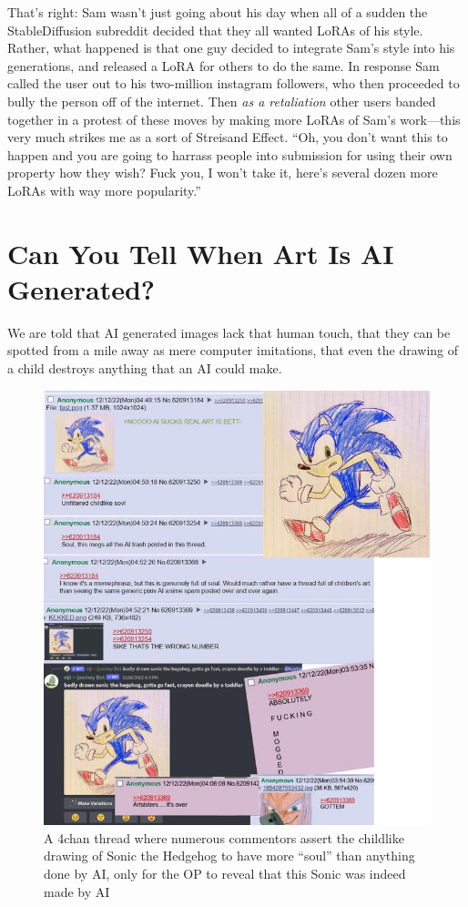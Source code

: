 \documentclass[11pt]{article}
\begin{document}
That's right: Sam wasn't just going about his day when all of a sudden the StableDiffusion subreddit decided that they all wanted LoRAs of his style. Rather, what happened is that one guy decided to integrate Sam's style into his generations, and released a LoRA for others to do the same. In response Sam called the user out to his two-million instagram followers, who then proceeded to bully the person off of the internet. Then \emph{as a retaliation} other users banded together in a protest of these moves by making more LoRAs of Sam's work---this very much strikes me as a sort of Streisand Effect. ``Oh, you don't want this to happen and you are going to harrass people into submission for using their own property how they wish? Fuck you, I won't take it, here's several dozen more LoRAs with way more popularity.''

\section*{Can You Tell When Art Is AI Generated?}
\label{sec:org07198dd}
We are told that AI generated images lack that human touch, that they can be spotted from a mile away as mere computer imitations, that even the drawing of a child destroys anything that an AI could make.

\begin{figure}[htbp]
\centering
\includegraphics[width=.9\linewidth]{./images/people-cant-tell-AI-art-apart-from-human-art.png}
\caption{A 4chan thread where numerous commentors assert the childlike drawing of Sonic the Hedgehog to have more ``soul'' than anything done by AI, only for the OP to reveal that this Sonic was indeed made by AI}
\end{figure}
\end{document}
